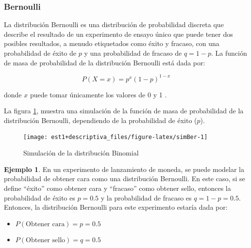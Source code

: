 \documentclass[
  11pt,
]{book}
\providecommand{\tightlist}{%
  \setlength{\itemsep}{0pt}\setlength{\parskip}{0pt}}
\theoremstyle{definition}
\theoremstyle{definition}
\newtheorem{example}{Ejemplo}[chapter]
\theoremstyle{definition}
\theoremstyle{definition}
\theoremstyle{remark}
\begin{document}
\subsubsection{Bernoulli}\label{probabilidad-variable-aleatoria-discreta-distribucion-bernoulli}

La distribución Bernoulli es una distribución de probabilidad discreta que describe el resultado de un experimento de ensayo único que puede tener dos posibles resultados, a menudo etiquetados como éxito y fracaso, con una probabilidad de éxito de \(p\) y una probabilidad de fracaso de \(q = 1 - p\). La función de masa de probabilidad de la distribución Bernoulli está dada por:

\begin{equation}
P(X = x) = p^x(1-p)^{1-x}
\label{eq:bernoulli}
\end{equation}

donde \(x\) puede tomar únicamente los valores de 0 y 1 \citep[página 105]{larsen}.

La figura \ref{fig:simBer}, muestra una simulación de la función de masa de probabilidad de la distribución Bernoulli, dependiendo de la probabilidad de éxito (\(p\)).

\begin{figure}

{\centering \texttt{[image: est1+descriptiva\_files/figure-latex/simBer-1]} 

}

\caption{Simulación de la distribución Binomial}\label{fig:simBer}
\end{figure}

\begin{example}

En un experimento de lanzamiento de moneda, se puede modelar la probabilidad de obtener cara como una distribución Bernoulli. En este caso, si se define ``éxito'' como obtener cara y ``fracaso'' como obtener sello, entonces la probabilidad de éxito es \(p = 0.5\) y la probabilidad de fracaso es \(q = 1 - p = 0.5\). Entonces, la distribución Bernoulli para este experimento estaría dada por:

\begin{itemize}
\tightlist
\item
  \(P(\text{Obtener cara}) = p = 0.5\)
\item
  \(P(\text{Obtener sello}) = q = 0.5\)
\end{itemize}

\end{example}
\end{document}
